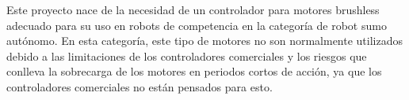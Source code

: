 \documentclass[11pt]{report}
\begin{document}
Este proyecto nace de la necesidad de un controlador para motores brushless adecuado para su uso en robots de competencia en la categoría de robot sumo autónomo. En esta categoría, este tipo de motores no son normalmente utilizados debido a las limitaciones de los controladores comerciales y los riesgos que conlleva la sobrecarga de los motores en periodos cortos de acción, ya que los controladores comerciales no están pensados para esto.



\begin{comment}
\begin{itemize}
	\item Configurar el microcontrolador con STM32CubeMX.
	\item Implementar el controlador de velocidad y corriente.
	\item No se va a implementar el control de posición.
	\item Se va a programar el firmware utilizando VScode y C.
	\item Se compilará el firmware con makefile y GCC con la extensión STM32 por VScode.
	\item Cargar el firmware con STM32CubeProgrammer y ST-link.
	\item Diseñar la PCB en Eagle.
	\item Diseñar piezas extra en Autodesk Inventor y posterior fabricación en impresión 3D.
	\item Fabricar y semi ensamblar la PCB con JLCPCB.
	\item Obtener datos detallados en tiempo de ejecución.
	\item Graficar los datos con Plotly en Python.
	\item Identificar posibles mejoras.
\end{itemize}
\end{comment}
\end{document}
